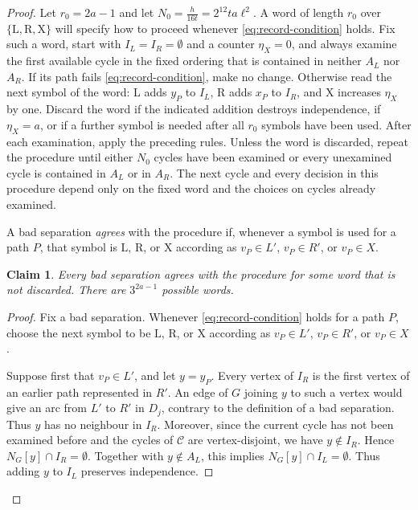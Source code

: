 \documentclass[11pt,a4paper]{article}
\newtheorem{claim}{Claim}
\theoremstyle{remark}
\numberwithin{equation}{section}
\newcommand{\calC}{\mathcal{C}}
\begin{document}
\begin{proof}
		Let $r_0=2a-1$ and let $N_0=\frac{h}{16t}=2^{12}ta\ell^2$.
		A word of length $r_0$ over $\{\mathrm{L},\mathrm{R},\mathrm{X}\}$ will specify how
		to proceed whenever \eqref{eq:record-condition} holds.
		Fix such a word, start with $I_L=I_R=\emptyset$ and a counter $\eta_X=0$, and always
		examine the first available cycle in the fixed ordering that is contained in
		neither $A_L$ nor $A_R$.
		If its path fails \eqref{eq:record-condition}, make no change.
		Otherwise read the next symbol of the word: $\mathrm{L}$ adds $y_P$ to $I_L$,
		$\mathrm{R}$ adds $x_P$ to $I_R$, and $\mathrm{X}$ increases $\eta_X$ by one.
		Discard the word if the indicated addition destroys independence, if $\eta_X=a$, or
		if a further symbol is needed after all $r_0$ symbols have been used.
		After each examination, apply the preceding rules. Unless the word is
		discarded, repeat the procedure until either $N_0$ cycles have been examined
		or every unexamined cycle is contained in $A_L$ or in $A_R$.
		The next cycle and every decision in this procedure depend only on the fixed
		word and the choices on cycles already examined.
		
		A bad separation \emph{agrees} with the procedure if, whenever a symbol is
		used for a path $P$, that symbol is $\mathrm{L}$, $\mathrm{R}$, or $\mathrm{X}$
		according as $v_P\in L'$, $v_P\in R'$, or $v_P\in X$.
		
		\begin{claim}\label{cl:records}
			Every bad separation agrees with the procedure for some word that is not
			discarded. There are $3^{2a-1}$ possible words.
		\end{claim}
		
		\begin{proof}
			Fix a bad separation. Whenever \eqref{eq:record-condition} holds for a path
			$P$, choose the next symbol to be $\mathrm{L}$, $\mathrm{R}$, or $\mathrm{X}$
			according as $v_P\in L'$, $v_P\in R'$, or $v_P\in X$.
			
			Suppose first that $v_P\in L'$, and let $y=y_P$. Every vertex of $I_R$ is
			the first vertex of an earlier path represented in $R'$. An edge of $G$
			joining $y$ to such a vertex would give an arc from $L'$ to $R'$ in $D_j$,
			contrary to the definition of a bad separation. Thus $y$ has no neighbour in $I_R$.
			Moreover, since the current cycle has not been examined before and the cycles
			of $\calC$ are vertex-disjoint, we have $y\notin I_R$. Hence
			$N_G[y]\cap I_R=\emptyset$. Together with $y\notin A_L$, this implies
			$N_G[y]\cap I_L=\emptyset$. Thus adding $y$ to $I_L$ preserves independence.
			

\end{proof}
\end{proof}
\end{document}
